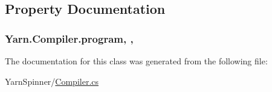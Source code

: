 \subsection{Property Documentation}
\hypertarget{a00032_aa1737da428ec7d597009661dd8a47829}{
\subsubsection[{program}]{ Yarn.\-Compiler.\-program\hspace{0.3cm}{\ttfamily [get]}, {\ttfamily [set]}, {\ttfamily [package]}}}\label{a00032_aa1737da428ec7d597009661dd8a47829}


The documentation for this class was generated from the following file\-:\begin{DoxyCompactItemize}
\item 
Yarn\-Spinner/\hyperlink{a00261}{Compiler.\-cs}\end{DoxyCompactItemize}
